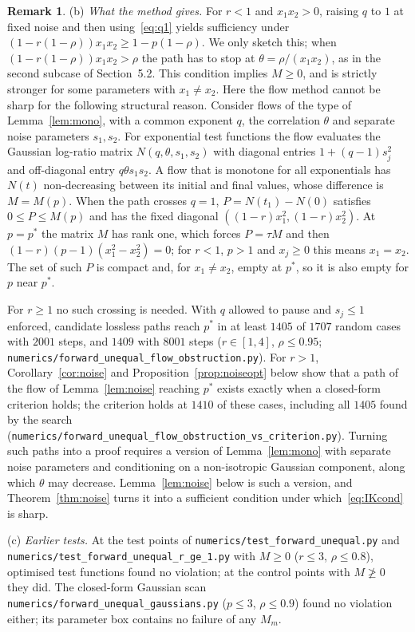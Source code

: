 \documentclass[11pt]{amsart}
\theoremstyle{definition}
\newtheorem{remark}[theorem]{Remark}
\begin{document}
\begin{remark}
(b) \emph{What the method gives.} For $r<1$ and $x_1x_2>0$, raising $q$ to $1$ at fixed noise and then
using~\eqref{eq:q1} yields sufficiency under $(1-r(1-\rho))x_1x_2\ge1-p(1-\rho)$. We only sketch this; when
$(1-r(1-\rho))x_1x_2>\rho$ the path has to stop at $\theta=\rho/(x_1x_2)$, as in the second subcase of Section~5.2.
This condition implies $M\ge0$, and is strictly stronger for some parameters with $x_1\ne x_2$. Here the flow method
cannot be sharp for the following structural reason. Consider flows of the type of Lemma~\ref{lem:mono}, with a common
exponent $q$, the correlation $\theta$ and separate noise parameters $s_1,s_2$. For exponential test functions the flow
evaluates the Gaussian log-ratio matrix $N(q,\theta,s_1,s_2)$ with diagonal entries $1+(q-1)s_j^2$ and off-diagonal
entry $q\theta s_1s_2$. A flow that is monotone for all exponentials has $N(t)$ non-decreasing between its initial and
final values, whose difference is $M=M(p)$. When the path crosses $q=1$, $P=N(t_1)-N(0)$ satisfies $0\le P\le M(p)$
and has the fixed diagonal $((1-r)x_1^2,(1-r)x_2^2)$. At $p=p^*$ the matrix $M$ has rank one, which forces
$P=\tau M$ and then $(1-r)(p-1)(x_1^2-x_2^2)=0$; for $r<1$, $p>1$ and $x_j\ge0$ this means $x_1=x_2$. The set of such
$P$ is compact and, for $x_1\ne x_2$, empty at $p^*$, so it is also empty for $p$ near $p^*$.

For $r\ge1$ no such crossing is needed. With $q$ allowed to pause and $s_j\le1$ enforced, candidate lossless paths reach
$p^*$ in at least $1405$ of $1707$ random cases with $2001$ steps, and $1409$ with $8001$ steps ($r\in[1,4]$,
$\rho\le0.95$; \texttt{numerics/forward\_unequal\_flow\_obstruction.py}). For $r>1$, Corollary~\ref{cor:noise} and
Proposition~\ref{prop:noiseopt} below show that a path of the flow of Lemma~\ref{lem:noise} reaching $p^*$ exists
exactly when a closed-form criterion holds; the criterion holds at $1410$ of these cases, including all $1405$ found by
the search (\texttt{numerics/forward\_unequal\_flow\_obstruction\_vs\_criterion.py}). Turning such paths into a proof requires a version of Lemma~\ref{lem:mono} with separate noise
parameters and conditioning on a non-isotropic Gaussian component, along which $\theta$ may decrease. Lemma~\ref{lem:noise}
below is such a version, and Theorem~\ref{thm:noise} turns it into a sufficient condition under
which~\eqref{eq:IKcond} is sharp.

(c) \emph{Earlier tests.} At the test points of \texttt{numerics/test\_forward\_unequal.py} and
\texttt{numerics/test\_forward\_unequal\_r\_ge\_1.py} with $M\ge0$ ($r\le3$, $\rho\le0.8$), optimised test functions found
no violation; at the control points with $M\not\ge0$ they did. The closed-form Gaussian scan
\texttt{numerics/forward\_unequal\_gaussians.py} ($p\le3$, $\rho\le0.9$) found no violation either; its parameter box
contains no failure of any $M_m$.
\end{remark}
\end{document}
